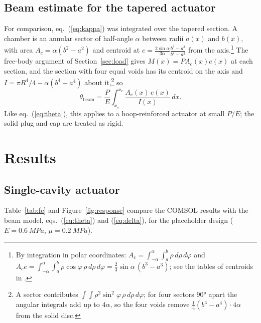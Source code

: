 \documentclass[12pt,a4paper,oneside]{report}
\numberwithin{equation}{chapter}
\numberwithin{figure}{chapter}
\numberwithin{table}{chapter}
\begin{document}
\section{Beam estimate for the tapered actuator}
For comparison, eq.~(\ref{eq:kappa}) was integrated over the tapered section. A chamber is an annular sector
of half-angle $\alpha$ between radii $a(x)$ and $b(x)$, with area $A_c=\alpha(b^2-a^2)$ and centroid at
$e=\frac{2\sin\alpha}{3\alpha}\frac{b^3-a^3}{b^2-a^2}$ from the axis.\footnote{By integration in polar
coordinates: $A_c=\int_{-\alpha}^{\alpha}\!\int_a^b\rho\,d\rho\,d\varphi$ and
$A_c e=\int_{-\alpha}^{\alpha}\!\int_a^b\rho\cos\varphi\,\rho\,d\rho\,d\varphi=\tfrac23\sin\alpha\,(b^3-a^3)$; see the
tables of centroids in \cite{gere2013}.} The free-body argument of Section~\ref{sec:load} gives
$M(x)=PA_c(x)e(x)$ at each section, and the section with four equal voids has its centroid on the axis and
$I=\pi R^4/4-\alpha(b^4-a^4)$ about it,\footnote{A sector contributes
$\int\!\!\int\rho^2\sin^2\varphi\,\rho\,d\rho\,d\varphi$; for four sectors \ang{90} apart the angular integrals
add up to $4\alpha$, so the four voids remove $\tfrac14(b^4-a^4)\cdot4\alpha$ from the solid disc.} so
\begin{equation}
\theta_{\text{beam}} = \frac{P}{E}\int_{x_s}^{x_e}\frac{A_c(x)\,e(x)}{I(x)}\,dx . \label{eq:taper}
\end{equation}
Like eq.~(\ref{eq:theta}), this applies to a hoop-reinforced actuator at small $P/E$; the solid plug and
cap are treated as rigid.

\chapter{Results}\label{ch:results}

\section{Single-cavity actuator}\label{sec:res1}
Table~\ref{tab:fe} and Figure~\ref{fig:response} compare the COMSOL results with the beam model,
eqs.~(\ref{eq:theta}) and (\ref{eq:delta}), for the placeholder design ($E=\SI{0.6}{MPa}$, $\mu=\SI{0.2}{MPa}$).
\end{document}
